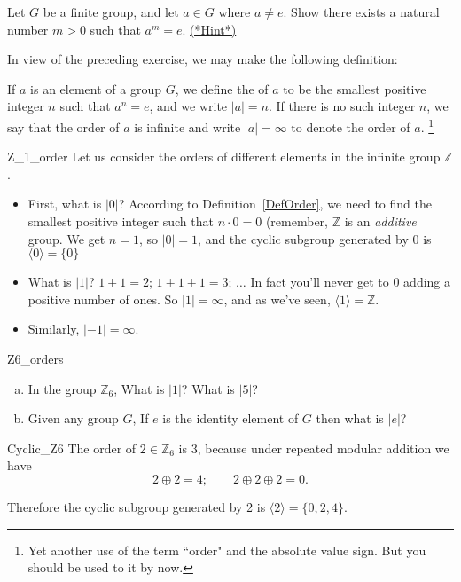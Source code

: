 \begin{exercise}{90}
Let $G$ be a finite group, and let $a \in G$ where $a \neq e$. Show there exists a natural number $m>0$ such that $a^m = e$.
\hyperref[sec:groups:hints]{(*Hint*)}
\end{exercise}
In view of the preceding exercise, we may make the following definition:

\begin{defn}\label{DefOrder}
If $a$ is an element of a group $G$, we define the  of $a$ to be the smallest positive integer $n$ such that $a^n= e$,
and we write $|a| = n$\label{noteelementorder}. If there is no such
integer $n$, we say that the order of $a$ is infinite and  write $|a|
= \infty$ to denote the order of $a$. \footnote{Yet another use of the term ``order" and the absolute value sign.  But you should be used to it by now.}
\end{defn} 

\begin{example}{Z_1_order}
Let us consider the orders of different elements in the infinite group $\mathbb Z$.
\begin{itemize}
\item
First, what is $| 0 |$?  According to Definition~\ref{DefOrder}, we need to find the smallest positive integer such that $n \cdot 0 = 0$  (remember, $\mathbb Z$ is an \emph{additive} group. We get $n=1$, so $| 0 | =1$, and the cyclic subgroup generated by $0$ is $\langle 0 \rangle = \{ 0 \}$
\item
What is $| 1 |$?  $1 + 1 = 2$; $1 + 1 + 1 = 3$; $\ldots$  In fact you'll never get to $0$ adding a positive number of ones.  So $| 1 | = \infty$, and as we've seen, $\langle 1 \rangle = \mathbb Z$.
\item
Similarly, $| -1 | = \infty$.
\end{itemize}
\end{example}

\begin{exercise}{Z6_orders}
\begin{enumerate}[(a)]
\item
In the group ${\mathbb Z}_6$, What is $| 1 |$? What is $| 5 |$?
\item
 Given any group $G$, If $e$ is the identity element of $G$ then what is $|e|$?
\end{enumerate}
 \end{exercise}

\begin{example}{Cyclic_Z6}
The order of $2 \in {\mathbb Z}_6$ is 3, because under repeated modular addition we have
\[
2 \oplus 2 = 4;\qquad  2 \oplus  2 \oplus  2 = 0.\]

\noindent
Therefore the cyclic subgroup generated by 2 is $\langle 2 \rangle  = \{ 0, 2, 4\}$.  
\end{example}

